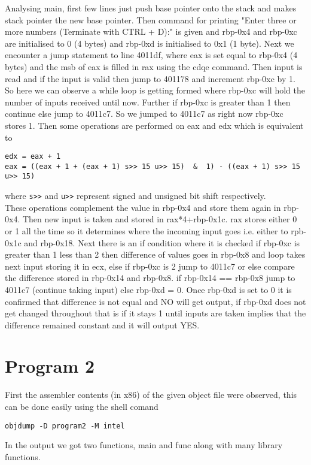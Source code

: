 \documentclass{article}
\begin{document}
Analysing main, first few lines just push base pointer onto the stack and makes stack pointer the new base pointer. Then command for printing "Enter three or more numbers (Terminate with CTRL + D):" is given and rbp-0x4 and rbp-0xc are initialised to 0 (4 bytes) and rbp-0xd is initialised to 0x1 (1 byte). Next we encounter a jump statement to line 4011df, where eax is set equal to rbp-0x4 (4 bytes) and the msb of eax is filled in rax using the cdqe command. Then input is read and if the input is valid then jump to 401178 and increment rbp-0xc by 1. So here we can observe a while loop is getting formed where rbp-0xc will hold the number of inputs received until now. Further if rbp-0xc is greater than 1 then continue else jump to 4011c7. So we jumped to 4011c7 as right now rbp-0xc stores 1. Then some operations are performed on eax and edx which is equivalent to
\begin{verbatim}
edx = eax + 1
eax = ((eax + 1 + (eax + 1) s>> 15 u>> 15)  &  1) - ((eax + 1) s>> 15 u>> 15)
\end{verbatim}
where \texttt{s>>}  and \texttt{u>>} represent signed and unsigned bit shift respectively.\\
These operations complement the value in rbp-0x4 and store them again in rbp-0x4. Then new input is taken and stored in rax*4+rbp-0x1c. rax stores either 0 or 1 all the time so it determines where the incoming input goes i.e. either to rpb-0x1c and rbp-0x18. Next there is an if condition where it is checked if rbp-0xc is greater than 1 less than 2 then difference of values goes in rbp-0x8 and loop takes next input storing it in ecx, else if rbp-0xc is 2 jump to 4011c7 or else compare the difference stored in rbp-0x14 and rbp-0x8. if rbp-0x14 == rbp-0x8 jump to 4011c7 (continue taking input) else rbp-0xd = 0. Once rbp-0xd is set to 0 it is confirmed that difference is not equal and NO will get output, if rbp-0xd does not get changed throughout that is if it stays 1 until inputs are taken implies that the difference remained constant and it will output YES. 


\section{Program 2}
First the assembler contents (in x86) of the given object file were observed, this can be done easily using the shell comand 
\begin{verbatim}
objdump -D program2 -M intel
\end{verbatim}
In the output we got two functions, main and func along with many library functions.
\end{document}
